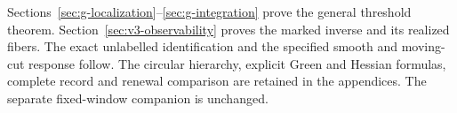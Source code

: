 Sections~\ref{sec:g-localization}--\ref{sec:g-integration} prove the
general threshold theorem. Section~\ref{sec:v3-observability} proves
the marked inverse and its realized fibers. The exact unlabelled
identification and the specified smooth and moving-cut response follow.
The circular hierarchy, explicit Green and Hessian formulas, complete
record and renewal comparison are retained in the appendices. The
separate fixed-window companion is unchanged.
